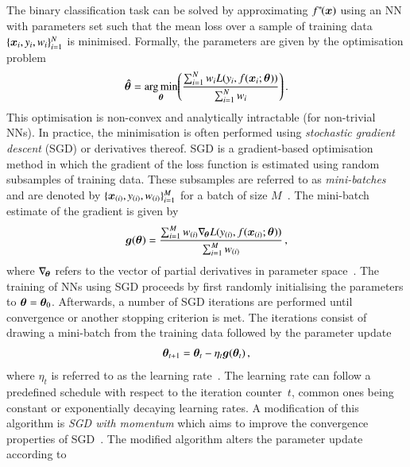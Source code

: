 The binary classification task can be solved by approximating
$f^{*\!}(\bm{x})$ using an NN with parameters set such that the mean loss
over a sample of training data~$\{\bm{x}_i, y_i, w_i\}_{i = 1}^N$ is
minimised. Formally, the parameters are given by the optimisation problem
\begin{align*}
  \bm{\hat{\theta}} =
  \operatorname*{arg\,min}_{\bm{\theta}}\mathopen{}\left(
  \frac{\sum_{i = 1}^{N} w_i L(y_i, f(\bm{x}_i; \bm{\theta}))}{\sum_{i = 1}^{N} w_i}
  \right)\mathclose{}
  \,\text{.}
\end{align*}
This optimisation is non-convex and analytically intractable (for non-trivial
NNs). In practice, the minimisation is often performed using \emph{stochastic
  gradient descent} (SGD) or derivatives thereof. SGD is a gradient-based
optimisation method in which the gradient of the loss function is estimated
using random subsamples of training data. These subsamples are referred to as
\emph{mini-batches} and are denoted by
$\{\bm{x}_{(i)}, y_{(i)}, w_{(i)}\}_{i=1}^{M}$ for a batch of size
$M$~\cite{Goodfellow-et-al-2016}. The mini-batch estimate of the gradient is
given by
\begin{align*}
  \bm{g}(\bm{\theta})
  = \frac{
  \sum_{i=1}^{M} w_{(i)}  \nabla_{\!\bm{\theta}} L(y_{(i)}, f(\bm{x}_{(i)}; \bm{\theta}))
  }{
  \sum_{i=1}^{M} w_{(i)}
  } \,\text{,}
\end{align*}
where $\nabla_{\!\bm{\theta}}$ refers to the vector of partial derivatives in
parameter space~\cite{Goodfellow-et-al-2016}. The training of NNs using SGD
proceeds by first randomly initialising the parameters to
$\bm{\theta} = \bm{\theta}_0$. Afterwards, a number of SGD iterations are
performed until convergence or another stopping criterion is met. The iterations
consist of drawing a mini-batch from the training data followed by the parameter
update
\begin{align*}
  \bm{\theta}_{t + 1} = \bm{\theta}_{t} - \eta_{t} \bm{g}(\bm{\theta}_{t}) \,\text{,}
\end{align*}
where $\eta_{t}$ is referred to as the learning
rate~\cite{Goodfellow-et-al-2016}. The learning rate can follow a predefined
schedule with respect to the iteration counter~$t$, common ones being constant
or exponentially decaying learning rates. A modification of this algorithm is
\emph{SGD with momentum} which aims to improve the convergence properties of
SGD~\cite{polyak1964some,rumelhart1986learning}. The modified algorithm alters
the parameter update according to
